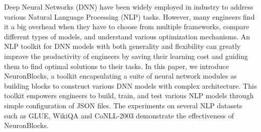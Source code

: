 Deep Neural Networks (DNN) have been widely employed in industry to address various Natural Language Processing (NLP) tasks. However, many engineers find it a big overhead when they have to choose from multiple frameworks, compare different types of models, and understand various optimization mechanisms. An NLP toolkit for DNN models with both generality and flexibility can greatly improve the productivity of engineers by saving their learning cost and guiding them to find optimal solutions to their tasks. In this paper, we introduce NeuronBlocks, a toolkit encapsulating a suite of neural network modules as building blocks to construct various DNN models with complex architecture. This toolkit empowers engineers to build, train, and test various NLP models through simple configuration of JSON files. The experiments on several NLP datasets such as GLUE, WikiQA and CoNLL-2003 demonstrate the effectiveness of NeuronBlocks.